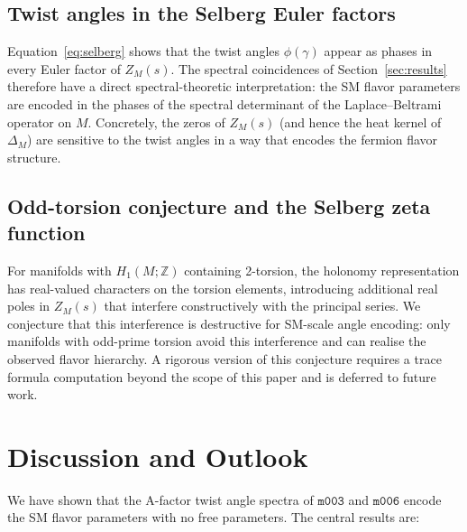 \documentclass[a4paper,11pt]{article}
\newcommand{\mfld}[1]{\texttt{#1}}
\begin{document}
\subsection{Twist angles in the Selberg Euler factors}

Equation~\eqref{eq:selberg} shows that the twist angles $\phi(\gamma)$ appear
as phases in every Euler factor of $Z_M(s)$.
The spectral coincidences of Section~\ref{sec:results} therefore have a direct
spectral-theoretic interpretation: the SM flavor parameters are encoded in the
phases of the spectral determinant of the Laplace--Beltrami operator on $M$.
Concretely, the zeros of $Z_M(s)$ (and hence the heat kernel of $\Delta_M$)
are sensitive to the twist angles in a way that encodes the fermion flavor
structure.

\subsection{Odd-torsion conjecture and the Selberg zeta function}

For manifolds with $H_1(M;\mathbb{Z})$ containing 2-torsion, the holonomy
representation has real-valued characters on the torsion elements, introducing
additional real poles in $Z_M(s)$ that interfere constructively with the
principal series.
We conjecture that this interference is destructive for SM-scale angle
encoding: only manifolds with odd-prime torsion avoid this interference and
can realise the observed flavor hierarchy.
A rigorous version of this conjecture requires a trace formula computation
beyond the scope of this paper and is deferred to future work.

\section{Discussion and Outlook}
\label{sec:discussion}

We have shown that the A-factor twist angle spectra of $\mfld{m003}$ and
$\mfld{m006}$ encode the SM flavor parameters with no free parameters.
The central results are:
\end{document}
